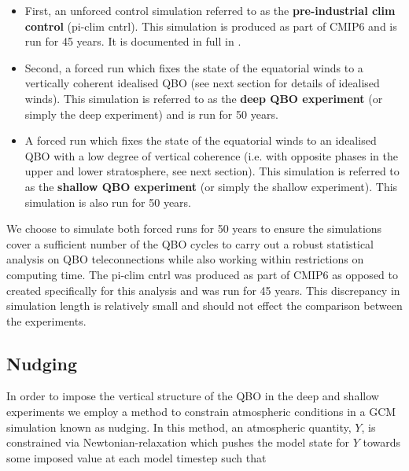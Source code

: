 \begin{itemize}
    \item First, an unforced control simulation referred to as the \textbf{pre-industrial clim control} (pi-clim cntrl). This simulation is produced as part of CMIP6 and is run for 45 years. It is documented in full in \cite{oconnorAssessment2021b}. 
    
    \item Second, a forced run which fixes the state of the equatorial winds to a vertically coherent idealised QBO (see next section for details of idealised winds). This simulation is referred to as the \textbf{deep QBO experiment} (or simply the deep experiment) and is run for 50 years.
    
    \item A forced run which fixes the state of the equatorial winds to an idealised QBO with a low degree of vertical coherence (i.e. with opposite phases in the upper and lower stratosphere, see next section). This simulation is referred to as the \textbf{shallow QBO experiment} (or simply the shallow experiment). This simulation is also run for 50 years.
    
\end{itemize}

We choose to simulate both forced runs for 50 years to ensure the simulations cover a sufficient number of the QBO cycles to carry out a robust statistical analysis on QBO teleconnections while also working within restrictions on computing time. The pi-clim cntrl was produced as part of CMIP6 as opposed to created specifically for this analysis and was run for 45 years. This discrepancy in simulation length is relatively small and should not effect the comparison between the experiments. 



\subsection{Nudging}
In order to impose the vertical structure of the QBO in the deep and shallow experiments we employ a method to constrain atmospheric conditions in a GCM simulation known as nudging. In this method, an atmospheric quantity, $Y$, is constrained via Newtonian-relaxation which pushes the model state for $Y$ towards some imposed value at each model timestep such that

